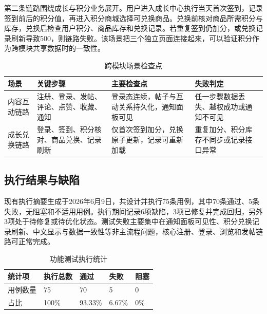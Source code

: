 \documentclass[bwprint]{report}
\begin{document}
第二条链路围绕成长与积分业务展开。用户进入成长中心执行当天首次签到，记录签到前后的积分值，再进入积分商城选择可兑换商品。兑换前核对商品所需积分与库存，兑换后检查用户积分、商品库存和兑换记录。若重复签到仍加分，或兑换记录刷新导致500，则链路失败。该场景把三个独立页面连接起来，可以验证积分作为跨模块共享数据时的一致性。

\begin{table}[H]
\centering
\caption{跨模块场景检查点}
\begin{tabularx}{\textwidth}{P{2.2cm} P{4.2cm} Y Y}
\toprule
场景 & 关键步骤 & 主要检查点 & 失败判定 \\
\midrule
内容互动链路 & 注册、登录、发帖、评论、点赞、收藏、通知 & 登录态连续，帖子与互动关系持久化，通知面板可见 & 任一步骤数据丢失、越权成功或通知不可见 \\
成长兑换链路 & 登录、签到、积分核对、商品兑换、记录刷新 & 仅首次签到加分，兑换原子更新，记录可重新加载 & 重复加分、积分库存不同步或记录接口异常 \\
\bottomrule
\end{tabularx}
\end{table}

\subsection{执行结果与缺陷}
现有执行摘要生成于2026年6月9日，共设计并执行75条用例，其中70条通过、5条失败，无阻塞和不适用用例。执行期间记录6项缺陷，3项已修复并完成回归，另外3项处于待修复或待优化状态。测试失败主要集中在通知面板可见性、积分兑换记录刷新、中文显示与数据一致性等非主流程问题，核心注册、登录、浏览和发帖链路可正常完成。

\begin{table}[H]
\centering
\caption{功能测试执行统计}
\begin{tabular}{P{3cm}P{2.5cm}P{2.5cm}P{2.5cm}P{2.5cm}}
\toprule
统计项 & 执行总数 & 通过 & 失败 & 阻塞 \\
\midrule
用例数量 & 75 & 70 & 5 & 0 \\
占比 & 100\% & 93.33\% & 6.67\% & 0\% \\
\bottomrule
\end{tabular}
\end{table}
\end{document}
